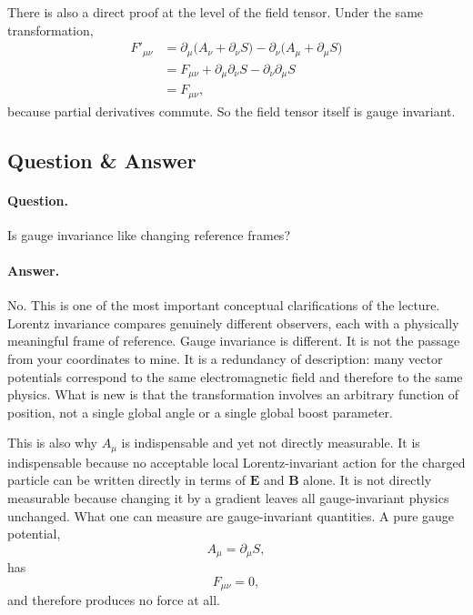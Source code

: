 There is also a direct proof at the level of the field tensor. Under the same transformation,
\begin{align}
F'_{\mu\nu}
&=
\partial_\mu\bigl(A_\nu+\partial_\nu S\bigr)
-
\partial_\nu\bigl(A_\mu+\partial_\mu S\bigr) \\
&=
F_{\mu\nu}
+
\partial_\mu\partial_\nu S
-
\partial_\nu\partial_\mu S \\
&=
F_{\mu\nu},
\end{align}
because partial derivatives commute. So the field tensor itself is gauge invariant.

\subsection{Question \& Answer}

\paragraph{Question.}
Is gauge invariance like changing reference frames?

\paragraph{Answer.}
No. This is one of the most important conceptual clarifications of the lecture. Lorentz invariance compares genuinely different observers, each with a physically meaningful frame of reference. Gauge invariance is different. It is not the passage from your coordinates to mine. It is a redundancy of description: many vector potentials correspond to the same electromagnetic field and therefore to the same physics. What is new is that the transformation involves an arbitrary function of position, not a single global angle or a single global boost parameter.

This is also why \(A_\mu\) is indispensable and yet not directly measurable. It is indispensable because no acceptable local Lorentz-invariant action for the charged particle can be written directly in terms of \(\mathbf E\) and \(\mathbf B\) alone. It is not directly measurable because changing it by a gradient leaves all gauge-invariant physics unchanged. What one can measure are gauge-invariant quantities. A pure gauge potential,
\begin{equation}
A_\mu=\partial_\mu S,
\end{equation}
has
\begin{equation}
F_{\mu\nu}=0,
\end{equation}
and therefore produces no force at all.

